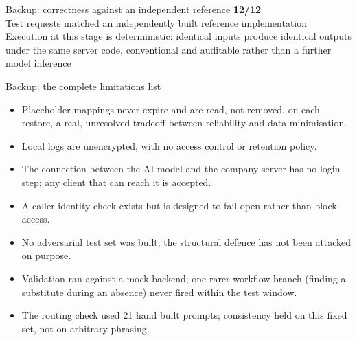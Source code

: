 \documentclass[aspectratio=169,11pt]{beamer}
\begin{document}
\begin{frame}{Backup: correctness against an independent reference}
  \centering
  \vspace{4mm}
  {\Huge\bfseries\color{slideblue} 12/12}\\[2mm]
  {\small Test requests matched an independently built reference implementation}\\[6mm]
  {\footnotesize\color{slidegray} Execution at this stage is deterministic: identical inputs produce identical outputs under the same server code, conventional and auditable rather than a further model inference}
\end{frame}

\begin{frame}{Backup: the complete limitations list}
  \scriptsize
  \begin{itemize}
    \setlength{\itemsep}{0.16cm}
    \item Placeholder mappings never expire and are read, not removed, on each restore, a real, unresolved tradeoff between reliability and data minimisation.
    \item Local logs are unencrypted, with no access control or retention policy.
    \item The connection between the AI model and the company server has no login step; any client that can reach it is accepted.
    \item A caller identity check exists but is designed to fail open rather than block access.
    \item No adversarial test set was built; the structural defence has not been attacked on purpose.
    \item Validation ran against a mock backend; one rarer workflow branch (finding a substitute during an absence) never fired within the test window.
    \item The routing check used 21 hand built prompts; consistency held on this fixed set, not on arbitrary phrasing.
  \end{itemize}
\end{frame}
\end{document}
